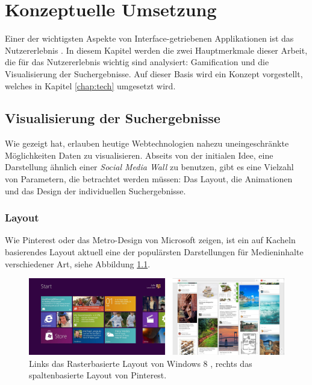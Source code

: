 \documentclass[12pt,twoside]{book}
\begin{document}
\chapter{Konzeptuelle Umsetzung}\label{chap:concept}

Einer der wichtigsten Aspekte von Interface-getriebenen Applikationen ist das Nutzererlebnis \citep[8 - 17]{garrett2010elements}. In diesem Kapitel werden die zwei Hauptmerkmale dieser Arbeit, die für das Nutzererlebnis wichtig sind analysiert: Gamification und die Visualisierung der Suchergebnisse. Auf dieser Basis wird ein Konzept vorgestellt, welches in Kapitel \ref{chap:tech} umgesetzt wird.

\section{Visualisierung der Suchergebnisse}\label{chap:concept:wall}

 Wie \cite{bostock2011d3} gezeigt hat, erlauben heutige Webtechnologien nahezu uneingeschränkte Möglichkeiten Daten zu visualisieren. Abseits von der initialen Idee, eine Darstellung ähnlich einer \textit{Social Media Wall} zu benutzen, gibt es eine Vielzahl von Parametern, die betrachtet werden müssen: Das Layout, die Animationen und das Design der individuellen Suchergebnisse.

\subsection{Layout}

Wie Pinterest \cite{pinterest} oder das Metro-Design von Microsoft zeigen, ist ein auf Kacheln  basierendes Layout aktuell eine der populärsten Darstellungen für Medieninhalte verschiedener Art, siehe Abbildung \ref{fig:metro_pinterest}.

\begin{figure}[htbp]
    \centering
    \includegraphics[width=1.0\textwidth]{images/metro_pinterest.png}
    \caption{Links das Rasterbasierte Layout von Windows 8 \cite{metrodesign}, rechts das spaltenbasierte Layout von Pinterest.}
    \label{fig:metro_pinterest}
  \end{figure}
\end{document}
